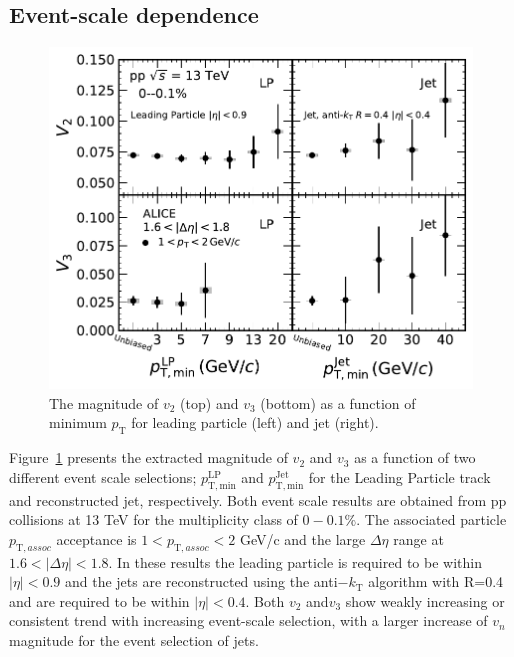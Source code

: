 \subsection{Event-scale dependence}
\begin{figure}[!th]
	\centering
	\includegraphics[width=0.8 \textwidth]{figures/Fig4_vn_LP.pdf}
	\caption{The magnitude of $v_2$ (top) and $v_3$ (bottom) as a function of minimum $p_{\mathrm{T}}$ for leading particle (left) and jet (right).}
	\label{fig:LPjet23}
\end{figure}

Figure~\ref{fig:LPjet23} presents the extracted magnitude of $v_2$ and $v_3$ as a function of two different event scale selections; $p_{\mathrm{T,min}}^{\mathrm{LP}}$ and $p_{\mathrm{T,min}}^{\mathrm{Jet}}$ for the Leading Particle track and reconstructed jet, respectively. Both event scale results are obtained from pp collisions at 13 TeV for the multiplicity class of $0-0.1\%$. The associated particle $p_{\mathrm{T},assoc}$ acceptance is $1<p_{\mathrm{T},assoc}<2$ GeV/c and the large $\Delta\eta$ range at $1.6<|\Delta\eta|<1.8$. In these results the leading particle is required to be within $|\eta|<0.9$ and the jets are reconstructed using the anti$-k_\mathrm{T}$ algorithm with R=0.4 and are required to be within $|\eta|<0.4$. Both $v_2$ and$v_3$ show weakly increasing or consistent trend with increasing event-scale selection, with a larger increase of $v_n$ magnitude for the event selection of jets. 